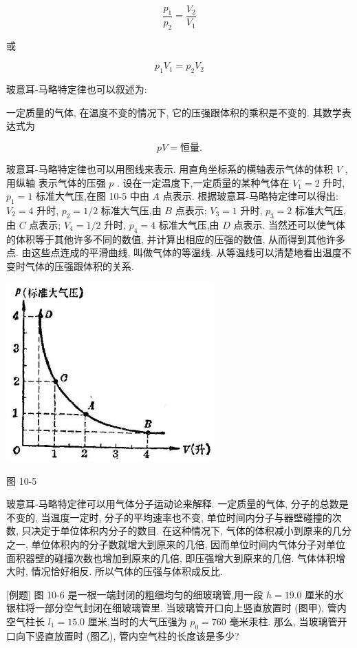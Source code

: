 \documentclass[10pt]{article}
\begin{document}
\[
\frac{{p}_{1}}{{p}_{2}} = \frac{{V}_{2}}{{V}_{1}}
\]

或

\[
{p}_{1}{V}_{1} = {p}_{2}{V}_{2}
\]

玻意耳-马略特定律也可以叙述为:

一定质量的气体, 在温度不变的情况下, 它的压强跟体积的乘积是不变的. 其数学表达式为

\[
{pV} = \text{恒量.}
\]

玻意耳-马略特定律也可以用图线来表示. 用直角坐标系的横轴表示气体的体积 \(V\) ,用纵轴 表示气体的压强 \(p\) . 设在一定温度下,一定质量的某种气体在 \({V}_{1} = 2\) 升时, \({p}_{1} = 1\) 标准大气压,在图 10-5 中由 \(A\) 点表示. 根据玻意耳-马略特定律可以得出: \({V}_{2} = 4\) 升时, \({p}_{2} = 1/2\) 标准大气压,由 \(B\) 点表示; \({V}_{3} = 1\) 升时, \({p}_{3} = 2\) 标准大气压,由 \(C\) 点表示; \({V}_{4} = 1/2\) 升时, \({p}_{4} = 4\) 标准大气压,由 \(D\) 点表示. 当然还可以使气体的体积等于其他许多不同的数值, 并计算出相应的压强的数值, 从而得到其他许多点. 由这些点连成的平滑曲线, 叫做气体的等温线. 从等温线可以清楚地看出温度不变时气体的压强跟体积的关系.

\begin{center}
\includegraphics[max width=0.6\textwidth]{images/01912d55-147c-70aa-b0e0-1782a122f948_285_679303.jpg}
\end{center}

图 10-5

玻意耳-马略特定律可以用气体分子运动论来解释. 一定质量的气体, 分子的总数是不变的, 当温度一定时, 分子的平均速率也不变, 单位时间内分子与器壁碰撞的次数, 只决定于单位体积内分子的数目. 在这种情况下, 气体的体积减小到原来的几分之一, 单位体积内的分子数就增大到原来的几倍, 因而单位时间内气体分子对单位面积器壁的碰撞次数也增加到原来的几倍, 即压强增大到原来的几倍. 气体体积增大时, 情况恰好相反. 所以气体的压强与体积成反比.

[例题] 图 10-6 是一根一端封闭的粗细均匀的细玻璃管,用一段 \(h = {19.0}\) 厘米的水银柱将一部分空气封闭在细玻璃管里. 当玻璃管开口向上竖直放置时 (图甲), 管内空气柱长 \({l}_{1} = {15.0}\) 厘米,当时的大气压强为 \({p}_{0} = {760}\) 毫米汞柱. 那么, 当玻璃管开口向下竖直放置时 (图乙), 管内空气柱的长度该是多少?
\end{document}
